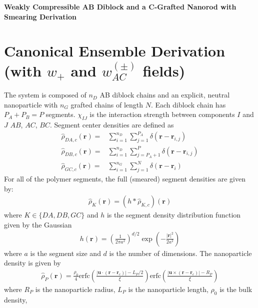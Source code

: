 \documentclass{article}
\begin{document}
  \begin{center}
    \textbf{Weakly Compressible AB Diblock and a C-Grafted Nanorod with
    Smearing Derivation}
  \end{center}
  
  \section{Canonical Ensemble Derivation (with $w_+$ and $w_{AC}^{(\pm)}$ fields)}
  
  The system is composed of $n_D$ AB diblock chains and an explicit, neutral
    nanoparticle with $n_G$ grafted chains of length $N$.
  Each diblock chain has $P_A + P_B = P$ segments.
  $\chi_{IJ}$ is the interaction strength between components $I$ and $J$
    $AB$, $AC$, $BC$.
  Segment center densities are defined as
  \begin{align*}
    \hat{\rho}_{DA,c} (\mathbf{r}) =&
      \sum_{i=1}^{n_D} \sum_{j=1}^{P_A}
      \delta(\mathbf{r} - \mathbf{r}_{i,j}) \\
    \hat{\rho}_{DB,c} (\mathbf{r}) =&
      \sum_{i=1}^{n_D} \sum_{j=P_A+1}^{P}
      \delta(\mathbf{r} - \mathbf{r}_{i,j}) \\
    \hat{\rho}_{GC,c} (\mathbf{r}) =&
      \sum_{i=1}^{n_G} \sum_{j=1}^{N}
      \delta(\mathbf{r} - \mathbf{r}_i)
  \end{align*}
  For all of the polymer segments, the full (smeared) segment densities are given
    by:
  \begin{align*}
    \hat{\rho}_K(\mathbf{r}) = (h \ast \hat{\rho}_{K,c})(\mathbf{r})
  \end{align*}
  where $K \in \{ DA, DB, GC\}$ and $h$ is the segment density distribution
    function given by the Gaussian
  \begin{align*}
    h(\mathbf{r}) = \left( \frac{1}{2\pi a^2} \right)^{d/2}
    \exp \left( - \frac{|\mathbf{r}|^2}{2a^2}  \right)
  \end{align*}
  where $a$ is the segment size and $d$ is the number of dimensions.
  The nanoparticle density is given by
  \begin{align*}
    \hat{\rho}_P(\mathbf{r}) =
      \frac{\rho_0}{4}
      \textrm{erfc} \left(
        \frac{|\mathbf{u} \cdot (\mathbf{r} - \mathbf{r}_c)| - L_P/2}{\xi} 
      \right)
      \textrm{erfc} \left(
        \frac{|\mathbf{u} \times (\mathbf{r} - \mathbf{r}_c)| - R_P}{\xi}       
      \right)
  \end{align*}
  where $R_P$ is the nanoparticle radius, $L_P$ is the nanoparticle length, $\rho_0$ is the bulk density,
\end{document}
